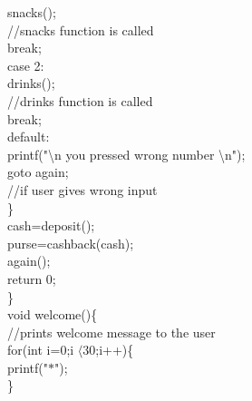 \documentclass[10pt,a4paper]{article}
\begin{document}
\begin{flushleft}
    \hspace*{0.5cm}  \hspace*{0.5cm}   snacks();  \\//snacks function is called\\
    \hspace*{0.5cm}  \hspace*{0.5cm}  break;\\
    \hspace*{0.5cm}  case 2:\\
    \hspace*{0.5cm}  \hspace*{0.5cm}  drinks();\\   //drinks function is called\\
    \hspace*{0.5cm}  \hspace*{0.5cm} break;\\
    \hspace*{0.5cm}  default:\\
    \hspace*{0.5cm}  \hspace*{0.5cm}   printf("\textbackslash n you pressed wrong number \textbackslash n");\\
    \hspace*{0.5cm}  \hspace*{0.5cm}  goto again;\\   //if user gives wrong input\\
    \hspace*{0.5cm} \}\\
    \hspace*{0.5cm} cash=deposit();\\
    \hspace*{0.5cm}  purse=cashback(cash);\\
    \hspace*{0.5cm}  again();\\
    \hspace*{0.5cm}  return 0;\\ 
\}\\
void welcome()\{\\    //prints welcome message to the user\\
    \hspace*{0.5cm}  for(int i=0;i $\langle$30;i++)\{\\
    \hspace*{0.5cm}  \hspace*{0.5cm}printf("$\ast$");\\
    \hspace*{0.5cm}  \}\\

\end{flushleft}
\end{document}
